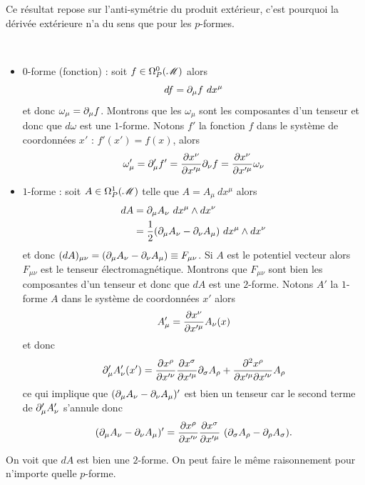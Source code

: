 \documentclass[a4paper,11pt]{report}
\begin{document}
            Ce résultat repose sur l'anti-symétrie du produit extérieur, c'est pourquoi la dérivée extérieure n'a du sens que pour les $p$-formes.
            
            \begin{exmp}${}$
                \begin{itemize}[label = \textbullet]
                    \item $0$-forme (fonction) : soit $f\in\Omega_P^0(\mathscr{M})$ alors 
                        \begin{equation}
                            df = \partial_\mu f ~dx^\mu
                        \end{equation}
                        et donc $\omega_\mu = \partial_\mu f$. Montrons que les $\omega_\mu$ sont les composantes d'un tenseur et donc que $d\omega$ est une $1$-forme. Notons $f'$ la fonction $f$ dans le système de coordonnées $x'$ : $f'(x') = f(x)$, alors
                        \begin{equation}
                            \omega'_\mu = \partial'_\mu f' = \pdv{x^\nu}{x'^\mu}\partial_{\nu}f = \pdv{x^\nu}{x'^\mu} \omega_\nu
                        \end{equation}
                    \item $1$-forme : soit $A\in\Omega_P^1(\mathscr{M})$ telle que $A=A_\mu~dx^\mu$ alors
                        \begin{align}
                            dA &= \partial_\mu A_\nu~dx^\mu\wedge dx^\nu\\
                            &= \frac{1}{2} (\partial_\mu A_\nu-\partial_\nu A_\mu)~dx^\mu\wedge dx^\nu
                        \end{align}
                        et donc $(dA)_{\mu\nu} = (\partial_\mu A_\nu-\partial_\nu A_\mu)\equiv F_{\mu\nu}$. Si $A$ est le potentiel vecteur alors $F_{\mu\nu}$ est le tenseur électromagnétique. Montrons que $F_{\mu\nu}$ sont bien les composantes d'un tenseur et donc que $dA$ est une $2$-forme. Notons $A'$ la $1$-forme $A$ dans le système de coordonnées $x'$ alors 
                        \begin{equation}
                            A'_\mu = \pdv{x^\nu}{x'^\mu} A_\nu(x)
                        \end{equation}
                        et donc 
                        \begin{equation}
                            \partial'_\mu A'_\nu(x') = \pdv{x^\rho}{x'^\nu}\pdv{x^\sigma}{x'^\mu}\partial_\sigma A_\rho + \pdv{x^\rho}{x'^\mu}{x'^\nu} A_\rho
                        \end{equation}
                        ce qui implique que $(\partial_\mu A_\nu-\partial_\nu A_\mu)'$ est bien un tenseur car le second terme de $\partial'_\mu A'_\nu$ s'annule donc
                        \begin{equation}
                            (\partial_\mu A_\nu-\partial_\nu A_\mu)' = \pdv{x^\rho}{x'^\nu}\pdv{x^\sigma}{x'^\mu}~ (\partial_\sigma A_\rho-\partial_\rho A_\sigma).
                        \end{equation}
                \end{itemize}
                On voit que $dA$ est bien une $2$-forme. On peut faire le même raisonnement pour n'importe quelle $p$-forme.
            \end{exmp}
            
\end{document}
